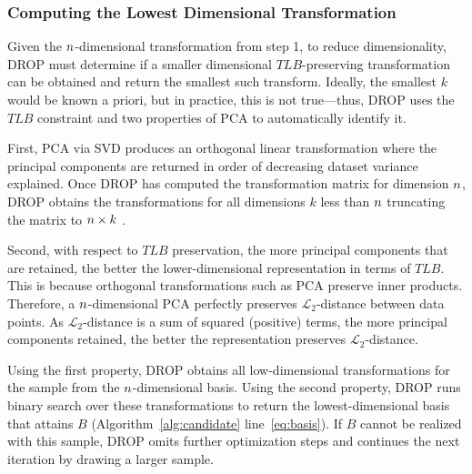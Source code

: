 \subsubsection{Computing the Lowest Dimensional Transformation}

Given the ${\color{black}n}$-dimensional transformation from step 1, to reduce dimensionality, DROP must determine if a smaller dimensional $TLB$-preserving transformation can be obtained and return the smallest such transform. 
Ideally, the smallest $k$ would be known a priori, but in practice, this is not true---thus, DROP uses the $TLB$ constraint and two properties of PCA to automatically identify it.

First, PCA via SVD produces an orthogonal linear transformation where the principal components  are returned in order of decreasing dataset variance explained.
Once DROP has computed the transformation matrix for dimension ${\color{black}n}$, DROP obtains the transformations for all dimensions $k$ less than ${\color{black}n}$ truncating the matrix to ${\color{black}n} \times k$ .

Second, with respect to $TLB$ preservation, the more principal components that are retained, the better the lower-dimensional representation in terms of $TLB$.  
This is because orthogonal transformations such as PCA preserve inner products. 
Therefore, a ${\color{black}n}$-dimensional PCA perfectly preserves $\mathcal{L}_2$-distance between data points. 
As $\mathcal{L}_2$-distance is a sum of squared (positive) terms, the more principal components retained, the better the representation preserves $\mathcal{L}_2$-distance.

Using the first property, DROP obtains all low-dimensional transformations for the sample from the ${\color{black}n}$-dimensional basis.  
Using the second property, DROP runs binary search over these transformations to return the lowest-dimensional basis that attains $B$ (Algorithm~\ref{alg:candidate} line~\ref{eq:basis}).
If $B$ cannot be realized with this sample, DROP omits further optimization steps and continues the next iteration by drawing a larger sample.

